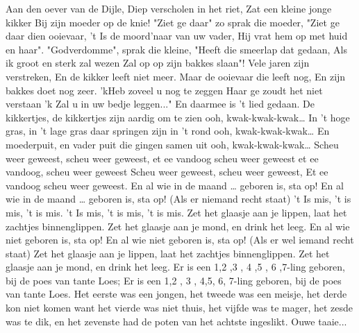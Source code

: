 \documentclass{article}
\begin{document}
\begin{songs}{}
\begin{intersong}
\end{intersong}
\beginverse
Aan den oever van de Dijle,
Diep verscholen in het riet,
Zat een kleine jonge kikker
Bij zijn moeder op de knie!
\endverse
\beginverse
"Ziet ge daar" zo sprak die moeder,
"Ziet ge daar dien ooievaar,
't Is de moord'naar van uw vader,
Hij vrat hem op met huid en haar".
\endverse
\beginverse
"Godverdomme", sprak die kleine,
"Heeft die smeerlap dat gedaan,
Als ik groot en sterk zal wezen
Zal op op zijn bakkes slaan"!
\endverse
\beginverse
Vele jaren zijn verstreken,
En de kikker leeft niet meer.
Maar de ooievaar die leeft nog,
En zijn bakkes doet nog zeer.
\endverse
\beginverse
'kHeb zoveel u nog te zeggen
Haar ge zoudt het niet verstaan
'k Zal u in uw bedje leggen..."
En daarmee is 't lied gedaan.
\endverse
\endsong
{}
\beginverse
De kikkertjes, de kikkertjes
zijn aardig om te zien          
ooh, kwak-kwak-kwak… 
\endverse
\beginchorus
In 't hoge gras, in 't lage gras
daar springen zijn in 't rond  
ooh, kwak-kwak-kwak… 
\endchorus
\beginverse
En moederpuit, en vader puit
die gingen samen uit              
ooh, kwak-kwak-kwak… 
\endverse
\beginverse
Scheu weer geweest, scheu weer geweest,
et ee vandoog scheu weer geweest 
\endverse
\beginverse
et ee vandoog, scheu weer geweest 
\endverse
\beginverse
Scheu weer geweest, scheu weer geweest,
Et ee vandoog scheu weer geweest. 
\endverse    
\endsong   
{}
\beginverse*
En al wie in de maand … geboren is, sta op!
En al wie in de maand … geboren is, sta op!
\endverse
\beginchorus
 (Als er niemand recht staat)
't Is mis, 't is mis, 't is mis.
't Is mis, 't is mis, 't is mis.
\endchorus
\beginchorus
Zet het glaasje aan je lippen,
laat het zachtjes binnenglippen.
Zet het glaasje aan je mond,
en drink het leeg.
\endchorus
\beginverse*
En al wie niet geboren is, sta op!
En al wie niet geboren is, sta op!
\endverse
\beginverse*
(Als er wel iemand recht staat)
Zet het glaasje aan je lippen,
laat het zachtjes binnenglippen.
Zet het glaasje aan je mond,
en drink het leeg.
\endverse
\endsong
{}
\beginverse*
Er is een 1,2 ,3 , 4 ,5 , 6 ,7-ling geboren, bij de
poes van tante Loes;
Er is een 1,2 , 3 , 4,5, 6, 7-ling geboren, bij de
poes van tante Loes.
Het eerste was een jongen, het tweede was een meisje,
het derde kon niet komen want het vierde was niet thuis,
het vijfde was te mager, het zesde was te dik,
en het zevenste had de poten van het achtste ingeslikt. 
Ouwe taaie...
\endverse
\endsong
\begin{intersong}

\end{intersong}
\end{songs}
\end{document}
